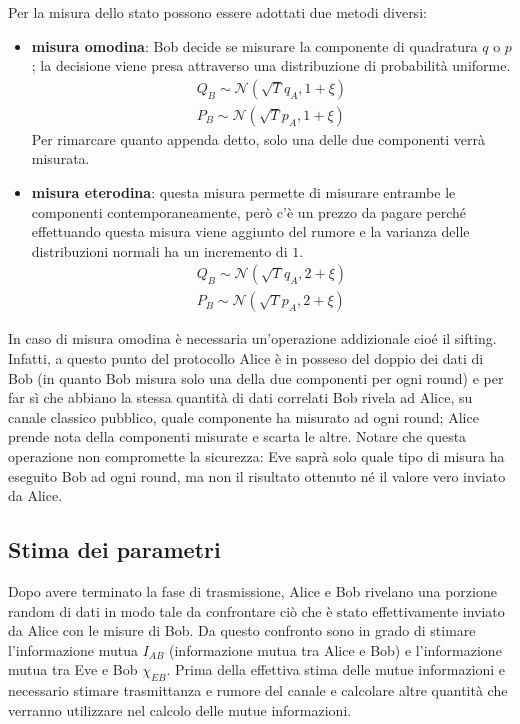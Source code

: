 Per la misura dello stato possono essere adottati due metodi diversi:
\begin{itemize}
\item \textbf{misura omodina}: Bob decide se misurare la componente di quadratura $q$ o $p$; la decisione viene presa attraverso una distribuzione di probabilit\`a uniforme.
\begin{equation}
\begin{split}
Q_B \sim \mathcal N(\sqrt{T}q_A, 1 + \xi) \\
P_B \sim \mathcal N(\sqrt{T}p_A, 1 + \xi)
\end{split}
\end{equation}
Per rimarcare quanto appenda detto, solo una delle due componenti verr\`a misurata.
\item \textbf{misura eterodina}: questa misura permette di misurare entrambe le componenti contemporaneamente, per\`o c'\`e un prezzo da pagare perch\'e effettuando questa misura viene aggiunto del rumore e la varianza delle distribuzioni normali ha un incremento di $1$.
\begin{equation}
\begin{split}
Q_B \sim \mathcal N(\sqrt{T}q_A, 2 + \xi) \\
P_B \sim \mathcal N(\sqrt{T}p_A, 2 + \xi)
\end{split}
\end{equation}
\end{itemize}  

In caso di misura omodina \`e necessaria un'operazione addizionale cio\'e il sifting. Infatti, a questo punto del protocollo Alice \`e in posseso del doppio dei dati di Bob (in quanto Bob misura solo una della due componenti per ogni round) e per far s\`i che abbiano la stessa quantit\`a di dati correlati Bob rivela ad Alice, su canale classico pubblico, quale componente ha misurato ad ogni round; Alice prende nota della componenti misurate e scarta le altre\cite{milicevic_key_2018}. Notare che questa operazione non compromette la sicurezza: Eve saprà solo quale tipo di misura ha eseguito Bob ad ogni round, ma non il risultato ottenuto né il valore  vero inviato da Alice.

\subsection{Stima dei parametri}\label{subse:stima-parametri}
Dopo avere terminato la fase di trasmissione, Alice e Bob rivelano una porzione random di dati in modo tale da confrontare ci\`o che \`e stato effettivamente inviato da Alice con le misure di Bob. Da questo confronto sono in grado di stimare l'informazione mutua $I_{AB}$ (informazione mutua tra Alice e Bob) e l'informazione mutua tra Eve e Bob $\chi_{EB}$. Prima della effettiva stima delle mutue informazioni e necessario stimare trasmittanza e rumore del canale e calcolare altre quantit\`a che verranno utilizzare nel calcolo delle mutue informazioni.

